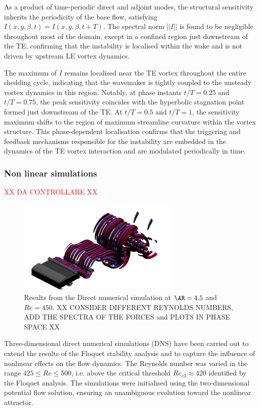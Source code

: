 As a product of time-periodic direct and adjoint modes, the structural sensitivity inherits the periodicity of the base flow, satisfying $I(x,y,\beta,t) = I (x,y,\beta,t+T)$. The spectral norm $||I||$ is found to be negligible throughout most of the domain, except in a confined region just downstream of the TE, confirming that the instability is localised within the wake and is not driven by upstream LE vortex dynamics.

The maximum of $I$ remains localised near the TE vortex throughout the entire shedding cycle, indicating that the wavemaker is tightly coupled to the unsteady vortex dynamics in this region. Notably, at phase instants $t/T=0.25$ and $t/T=0.75$, the peak sensitivity coincides with the hyperbolic stagnation point formed just downstream of the TE. At $t/T=0.5$ and $t/T=1$, the sensitivity maximum shifts to the region of maximum streamline curvature within the vortex structure. This phase-dependent localisation confirms that the triggering and feedback mechanisms responsible for the instability are embedded in the dynamics of the TE vortex interaction and are modulated periodically in time.

\subsubsection{Non linear simulations}

\textcolor{red}{XX DA CONTROLLARE XX}

\begin{figure}
  \centering
  \includegraphics[width=0.7\textwidth]{./fig/AR4p5/lambda2_omegax-3D-Re450b.png}
  \caption{Results from the Direct numerical simulation at $\AR=4.5$ and $Re=450$. XX CONSIDER DIFFERENT REYNOLDS NUMBERS, ADD THE SPECTRA OF THE FORCES and PLOTS IN PHASE SPACE XX}
  \label{fig:dns-ar4p5}
\end{figure}

Three-dimensional direct numerical simulations (DNS) have been carried out to extend the results of the Floquet stability analysis and to capture the influence of nonlinear effects on the flow dynamics. The Reynolds number was varied in the range $425 \le Re \le 500$, i.e. above the critical threshold $Re_{c3} \approx 420$ identified by the Floquet analysis. The simulations were initialised using the two-dimensional potential flow solution, ensuring an unambiguous evolution toward the nonlinear attractor.

